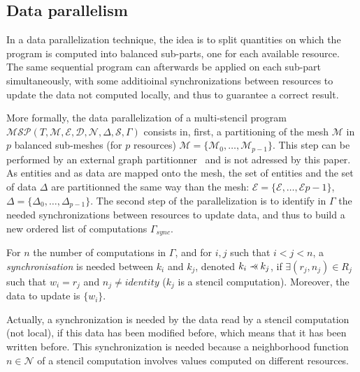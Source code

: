 
\subsection{Data parallelism}
\label{sect:dataparal}
In a data parallelization technique, the idea is to split quantities on which the program is computed into balanced sub-parts, one for each available resource. The same sequential program can afterwards be applied on each sub-part simultaneously, with some additioinal synchronizations between resources to update the data not computed locally, and thus to guarantee a correct result.

More formally, the data parallelization of a multi-stencil program $\mathcal{MSP}(T,\mathcal{M},\mathcal{E},\mathcal{D},\mathcal{N},\Delta, \mathcal{S},\Gamma)$ consists in, first, a partitioning of the mesh $\mathcal{M}$ in $p$ balanced sub-meshes (for $p$ resources) $\mathcal{M}=\{\mathcal{M}_0,\dots,\mathcal{M}_{p-1}\}$. This step can be performed by an external graph partitionner~\cite{} and is not adressed by this paper. As entities and as data are mapped onto the mesh, the set of entities and the set of data $\Delta$ are partitionned the same way than the mesh: $\mathcal{E}=\{\mathcal{E},\dots,\mathcal{E}{p-1}\}$, $\Delta=\{\Delta_0,\dots,\Delta_{p-1}\}$. The second step of the parallelization is to identify in $\Gamma$ the needed synchronizations between resources to update data, and thus to build a new ordered list of computations $\Gamma_{sync}$.

\begin{mydef}
For $n$ the number of computations in $\Gamma$, and for $i,j$ such that $i<j<n$, a \textit{synchronisation} is needed between $k_i$ and $k_j$, denoted $k_i \pprec k_j$, if $\exists (r_j,n_j) \in R_j$ such that $w_i=r_j$ and $n_j\neq identity$ ($k_j$ is a stencil computation). Moreover, the data to update is $\{w_i\}$.
\end{mydef}

Actually, a synchronization is needed by the data read by a stencil computation (not local), if this data has been modified before, which means that it has been written before. This synchronization is needed because a neighborhood function $n \in \mathcal{N}$ of a stencil computation involves values computed on different resources.

